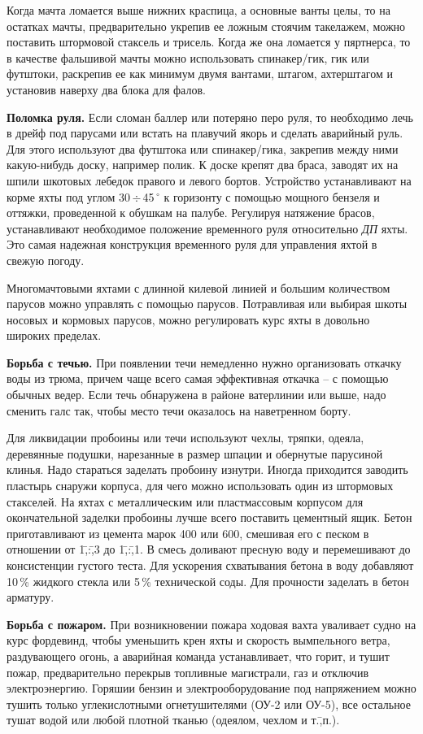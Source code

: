 \documentclass[a4paper, 12pt, twoside, final, book, russian, fittopage, cyremdash]{ncc}
\newcommand{\gr}{\ensuremath{\,^\circ}\xspace}
\newcommand{\otdo}{\,\ensuremath{\div}\,}
\begin{document}
Когда мачта ломается выше нижних краспица, а основные ванты целы, то на остатках мачты, предварительно укрепив ее ложным стоячим такелажем, можно поставить штормовой стаксель и трисель. Когда же она ломается у пяртнерса, то в качестве фальшивой мачты можно использовать спинакер\-/гик, гик или футштоки, раскрепив ее как минимум двумя вантами, штагом, ахтерштагом и установив наверху два блока для фалов.

\textbf{Поломка руля.} Если сломан баллер или потеряно перо руля, то необходимо лечь в дрейф под парусами или встать на плавучий якорь и сделать аварийный руль. Для этого используют два футштока или спинакер\-/гика, закрепив между ними какую-нибудь доску, например полик. К доске крепят два браса, заводят их на шпили шкотовых лебедок правого и левого бортов. Устройство устанавливают на корме яхты под углом 30\otdo 45\gr к горизонту с помощью мощного бензеля и оттяжки, проведенной к обушкам на палубе. Регулируя натяжение брасов, устанавливают необходимое положение временного руля относительно \textit{ДП} яхты. Это самая надежная конструкция временного руля для управления яхтой в свежую погоду.

Многомачтовыми яхтами с длинной килевой линией и большим количеством парусов можно управлять с помощью парусов. Потравливая или выбирая шкоты носовых и кормовых парусов, можно регулировать курс яхты в довольно широких пределах. 

\textbf{Борьба с течью.} При появлении течи немедленно нужно организовать откачку воды из трюма, причем чаще всего самая эффективная откачка \--- с помощью обычных ведер. Если течь обнаружена в районе ватерлинии или выше, надо сменить галс так, чтобы место течи оказалось на наветренном борту.

Для ликвидации пробоины или течи используют чехлы, тряпки, одеяла, деревянные подушки, нарезанные в размер шпации и обернутые парусиной клинья. Надо стараться заделать пробоину изнутри. Иногда приходится заводить пластырь снаружи корпуса, для чего можно использовать один из штормовых стакселей. На яхтах с металлическим или пластмассовым корпусом для окончательной заделки пробоины лучше всего поставить цементный ящик. Бетон приготавливают из цемента марок 400 или 600, смешивая его с песком в отношении от 1\=,:\=,3 до 1\=,:\=,1. В смесь доливают пресную воду и перемешивают до консистенции густого теста. Для ускорения схватывания бетона в воду добавляют 10\,\% жидкого стекла или 5\,\% технической соды. Для прочности заделать в бетон арматуру. 

\textbf{Борьба с пожаром.} При возникновении пожара ходовая вахта уваливает судно на курс фордевинд, чтобы уменьшить крен яхты и скорость вымпельного ветра, раздувающего огонь, а аварийная команда устанавливает, что горит, и тушит пожар, предварительно перекрыв топливные магистрали, газ и отключив электроэнергию. Горяшии бензин и электрооборудование под напряжением можно тушить только углекислотными огнетушителями (ОУ-2 или ОУ-5), все остальное тушат водой или любой плотной тканью (одеялом, чехлом и т.\=,п.).
\end{document}
